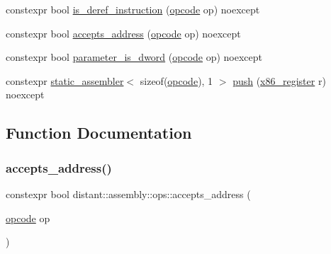 \begin{DoxyCompactItemize}
\item 
constexpr bool \mbox{\hyperlink{namespacedistant_1_1assembly_1_1ops_a5814220499f0f72f62540fb7ae5570ac}{is\+\_\+deref\+\_\+instruction}} (\mbox{\hyperlink{namespacedistant_1_1assembly_a64d7b047d9e3df1ac04919f7c4f8f6fa}{opcode}} op) noexcept
\item 
constexpr bool \mbox{\hyperlink{namespacedistant_1_1assembly_1_1ops_a01d6a74ca585289b2229f30b126e88fc}{accepts\+\_\+address}} (\mbox{\hyperlink{namespacedistant_1_1assembly_a64d7b047d9e3df1ac04919f7c4f8f6fa}{opcode}} op) noexcept
\item 
constexpr bool \mbox{\hyperlink{namespacedistant_1_1assembly_1_1ops_a00ef3c6a8dbb6ecb77c2fe1790ef3ffc}{parameter\+\_\+is\+\_\+dword}} (\mbox{\hyperlink{namespacedistant_1_1assembly_a64d7b047d9e3df1ac04919f7c4f8f6fa}{opcode}} op) noexcept
\item 
constexpr \mbox{\hyperlink{classdistant_1_1assembly_1_1static__assembler}{static\+\_\+assembler}}$<$ sizeof(\mbox{\hyperlink{namespacedistant_1_1assembly_a64d7b047d9e3df1ac04919f7c4f8f6fa}{opcode}}), 1 $>$ \mbox{\hyperlink{namespacedistant_1_1assembly_1_1ops_a32cc52491da0e2a291e595b409fd94fd}{push}} (\mbox{\hyperlink{namespacedistant_1_1assembly_a873d3faa0111fc5605de36beaaaafb3e}{x86\+\_\+register}} r) noexcept
\end{DoxyCompactItemize}


\subsection{Function Documentation}
\mbox{\label{namespacedistant_1_1assembly_1_1ops_a01d6a74ca585289b2229f30b126e88fc}} 
\subsubsection{\texorpdfstring{accepts\+\_\+address()}{accepts\_address()}}
{\footnotesize\ttfamily constexpr bool distant\+::assembly\+::ops\+::accepts\+\_\+address (\begin{DoxyParamCaption}\item[{\mbox{\hyperlink{namespacedistant_1_1assembly_a64d7b047d9e3df1ac04919f7c4f8f6fa}{opcode}}}]{op }\end{DoxyParamCaption})\hspace{0.3cm}{\ttfamily [noexcept]}}

